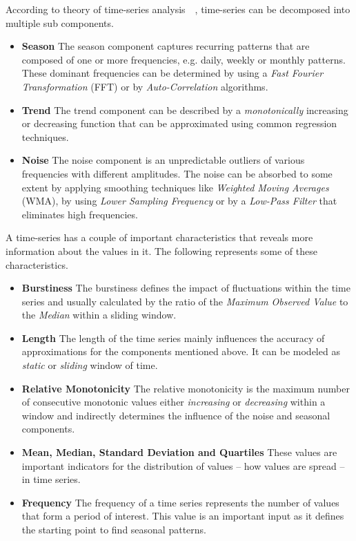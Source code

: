 According to theory of time-series analysis~\cite{TSA}~\cite{Herbst:2013}, time-series can be decomposed into multiple sub components.
\begin{itemize}
    \item \textbf{Season} The season component captures recurring patterns that are composed of one or more frequencies, e.g. daily, weekly or monthly patterns. These dominant frequencies can be determined by using a \emph{Fast Fourier Transformation} (FFT) or by \emph{Auto-Correlation} algorithms.
    \item \textbf{Trend} The trend component can be described by a \emph{monotonically} increasing or decreasing function that can be approximated using common regression techniques.
    \item \textbf{Noise} The noise component is an unpredictable outliers of various frequencies with different amplitudes. The noise can be absorbed to some extent by applying smoothing techniques like \emph{Weighted Moving Averages} (WMA), by using \emph{Lower Sampling Frequency} or by a \emph{Low-Pass Filter} that eliminates high frequencies.
\end{itemize}

A time-series has a couple of important characteristics that reveals more information about the values in it. The following represents some of these characteristics.
\begin{itemize}
    \item \textbf{Burstiness} The burstiness defines the impact of fluctuations within the time series and usually calculated by the ratio of the \emph{Maximum Observed Value} to the \emph{Median} within a sliding
    window.
    \item \textbf{Length} The length of the time series mainly influences the accuracy of approximations for the components mentioned above. It can be modeled as \emph{static} or \emph{sliding} window of time.
    \item \textbf{Relative Monotonicity} The relative monotonicity is the maximum number of consecutive monotonic values either \emph{increasing} or \emph{decreasing} within a window and indirectly determines the influence of the noise and seasonal components.
    \item \textbf{Mean, Median, Standard Deviation and Quartiles} These values are important indicators for the distribution of values -- how values are spread -- in time series.
    \item \textbf{Frequency} The frequency of a time series represents the number of values that form a period of interest. This value is an important input as it defines the starting point to find seasonal patterns.
\end{itemize}

